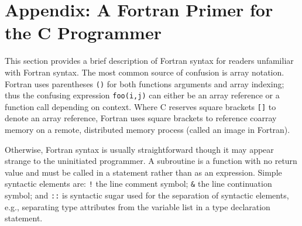 \section*{Appendix: A Fortran Primer for the C Programmer}

This section provides a brief description of Fortran syntax for readers unfamiliar with Fortran
syntax.  The most common source of confusion is array notation.  Fortran uses parentheses
\texttt{()} for both functions arguments and array indexing; thus the confusing expression
\texttt{foo(i,j)} can either be an array reference or a function call depending on context.  Where C
reserves square brackets \texttt{[]} to denote an array reference, Fortran uses square brackets to
reference coarray memory on a remote, distributed memory process (called an image in Fortran).

Otherwise, Fortran syntax is usually straightforward though it may appear strange to the uninitiated
programmer.  A subroutine is a function with no return value and must be called in a statement
rather than as an expression.  Simple syntactic elements are: \texttt{!} the line comment symbol;
\texttt{\&} the line continuation symbol; and \texttt{::} is syntactic sugar used for the separation
of syntactic elements, e.g., separating type attributes from the variable list in a type declaration
statement.
